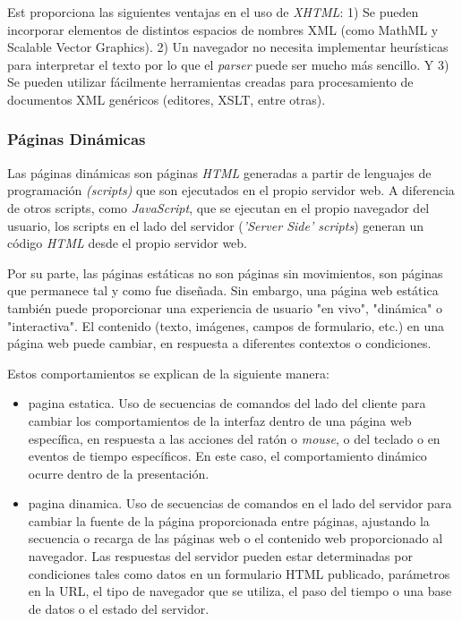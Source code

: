  Est proporciona las siguientes ventajas en el uso de \textit{XHTML}: 1) Se pueden incorporar elementos de distintos espacios de nombres XML (como MathML y Scalable Vector Graphics). 2)  Un navegador no necesita implementar heurísticas para interpretar el texto por lo que el \textit{parser} puede ser mucho más sencillo. Y 3) Se pueden utilizar fácilmente herramientas creadas para procesamiento de documentos XML genéricos (editores, XSLT, entre otras).

\subsubsection{Páginas Dinámicas}  
   

Las páginas dinámicas  \cite{Hoffer2016,Limoncelli2014} son páginas \textit{HTML} generadas a partir de lenguajes de programación \textit{(\gls{scripts})} que son ejecutados en el propio servidor web. A diferencia de otros scripts, como  \textit{JavaScript}, que se ejecutan en el propio navegador del usuario, los scripts en el lado del servidor (\textit{'Server Side' scripts})  generan un código \textit{HTML} desde el propio servidor web. 

Por su parte, las páginas estáticas no son  páginas sin movimientos, son páginas que permanece tal y como fue diseñada. Sin embargo, una página web estática también puede proporcionar una experiencia de usuario "en vivo", "dinámica" o "interactiva". El contenido (texto, imágenes, campos de formulario, etc.) en una página web puede cambiar, en respuesta a diferentes contextos o condiciones.

Estos comportamientos se explican de la siguiente manera:

\begin{itemize}
	\item \gls{pagina estatica}. Uso de secuencias de comandos del lado del cliente para cambiar los comportamientos de la interfaz dentro de una página web específica, en respuesta a las acciones del ratón o \textit{mouse}, o del teclado o en eventos de tiempo específicos. En este caso, el comportamiento dinámico ocurre dentro de la presentación. 
	\item \gls{pagina dinamica}. Uso de secuencias de comandos en el lado del servidor para cambiar la fuente de la página proporcionada entre páginas, ajustando la secuencia o recarga de las páginas web o el contenido web proporcionado al navegador. Las respuestas del servidor pueden estar determinadas por condiciones tales como datos en un formulario HTML publicado, parámetros en la URL, el tipo de navegador que se utiliza, el paso del tiempo o una base de datos o el estado del servidor.
\end{itemize}

